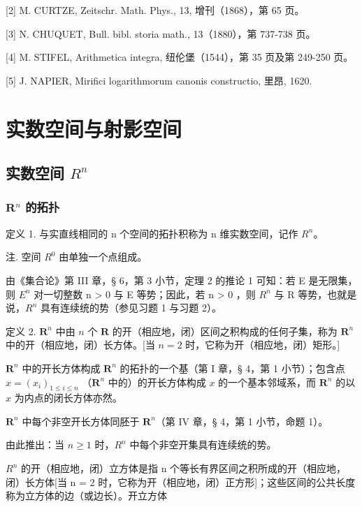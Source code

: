 {[}2{]} M. CURTZE, Zeitschr. Math. Phys., 13, 增刊（1868），第 65 页。

{[}3{]} N. CHUQUET, Bull. bibl. storia math., 13（1880），第 737-738 页。

{[}4{]} M. STIFEL, Arithmetica integra, 纽伦堡（1544），第 35 页及第 249-250 页。

{[}5{]} J. NAPIER, Mirifici logarithmorum canonis constructio, 里昂, 1620.

\chapter{实数空间与射影空间}

\section{\texorpdfstring{实数空间 \(R^{n}\)}{实数空间 R 的 n 次幂}}

\subsection{\texorpdfstring{\(\mathbf{R}^n\) 的拓扑}{R 的 n 次幂的拓扑}}

定义 1. 与实直线相同的 n 个空间的拓扑积称为 n 维实数空间，记作 \(R^{n}\)。

注. 空间 \(R^{0}\) 由单独一个点组成。

由《集合论》第 III 章，§ 6，第 3 小节，定理 2 的推论 1 可知：若 E 是无限集，则 \(E^{n}\) 对一切整数 n \textgreater{} 0 与 E 等势；因此，若 n \textgreater{} 0 ，则 \(R^{n}\) 与 R 等势，也就是说，\(R^{n}\) 具有连续统的势（参见习题 1 与习题 2）。

定义 2. \(\mathbf{R}^n\) 中由 \(n\) 个 \(\mathbf{R}\) 的开（相应地，闭）区间之积构成的任何子集，称为 \(\mathbf{R}^n\) 中的开（相应地，闭）长方体。{[}当 \(n = 2\) 时，它称为开（相应地，闭）矩形。{]}

\(\mathbf{R}^n\) 中的开长方体构成 \(\mathbf{R}^n\) 的拓扑的一个基（第 I 章，§ 4，第 1 小节）；包含点 \(x = (x_i)_{1 \leqslant i \leqslant n}\) （\(\mathbf{R}^n\) 中的）的开长方体构成 \(x\) 的一个基本邻域系，而 \(\mathbf{R}^n\) 的以 \(x\) 为内点的闭长方体亦然。

\(\mathbf{R}^n\) 中每个非空开长方体同胚于 \(\mathbf{R}^n\)（第 IV 章，§ 4，第 1 小节，命题 1）。

由此推出：当 \(n \geqslant 1\) 时，\(R^{n}\) 中每个非空开集具有连续统的势。

\(R^{n}\) 的开（相应地，闭）立方体是指 n 个等长有界区间之积所成的开（相应地，闭）长方体{[}当 n = 2 时，它称为开（相应地，闭）正方形{]}；这些区间的公共长度称为立方体的边（或边长）。开立方体

